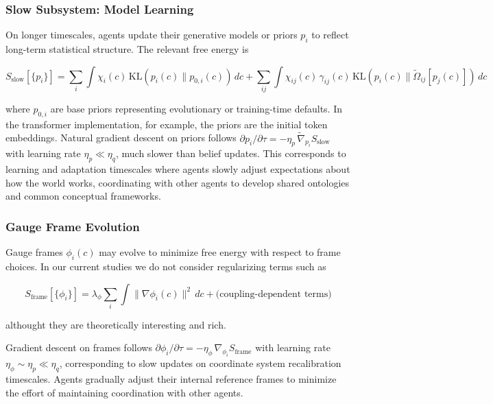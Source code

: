 \documentclass[11pt]{article}
\begin{document}
\subsubsection{Slow Subsystem: Model Learning}

On longer timescales, agents update their generative models or priors $p_i$ to reflect long-term statistical structure. The relevant free energy is

\begin{equation}
S_{\text{slow}}[\{p_i\}] = \sum_i \int \chi_i(c) \, \mathrm{KL}(p_i(c) \| p_{0,i}(c)) \, dc
+ \sum_{ij} \int \chi_{ij}(c) \, \gamma_{ij}(c) \, \mathrm{KL}(p_i(c) \| \tilde{\Omega}_{ij}[p_j(c)]) \, dc
\end{equation}

where $p_{0,i}$ are base priors representing evolutionary or training-time defaults. In the transformer implementation, for example, the priors are the initial token embeddings.  Natural gradient descent on priors follows $\partial p_i/\partial \tau = -\eta_p \, \tilde{\nabla}_{p_i} S_{\text{slow}}$ with learning rate $\eta_p \ll \eta_q$, much slower than belief updates. This corresponds to learning and adaptation timescales where agents slowly adjust expectations about how the world works, coordinating with other agents to develop shared ontologies and common conceptual frameworks.

\subsubsection{Gauge Frame Evolution}

Gauge frames $\phi_i(c)$ may evolve to minimize free energy with respect to frame choices.  In our current studies we do not consider regularizing terms such as

\begin{equation}
S_{\text{frame}}[\{\phi_i\}] = \lambda_\phi \sum_i \int \|\nabla \phi_i(c)\|^2 \, dc + \text{(coupling-dependent terms)}
\end{equation}

althought they are theoretically interesting and rich.

Gradient descent on frames follows $\partial \phi_i/\partial \tau = -\eta_\phi \, \nabla_{\phi_i} S_{\text{frame}}$ with learning rate $\eta_\phi \sim \eta_p \ll \eta_q$, corresponding to slow updates on coordinate system recalibration timescales. Agents gradually adjust their internal reference frames to minimize the effort of maintaining coordination with other agents. 
\end{document}
